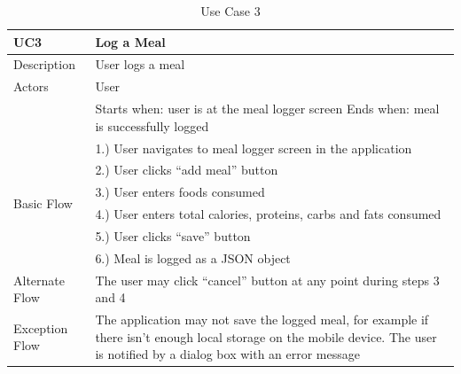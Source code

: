 \documentclass{article}
\begin{document}
\begin{appendicies}
\begin{table}[!htbp]
\centering
\hspace*{-0.5cm}
\begin{tabular}{||m{6cm}|m{6cm}||}
    \hline
    UC3 & Log a Meal\\
    \hline
    Description & User logs a meal\\
    \hline
    Actors & User\\
    \hline
    & Starts when: user is at the meal logger screen \newline
    Ends when: meal is successfully logged\\
    \hline
    \multirow{6}{\hsize}{Basic Flow} 
                                    & 1.) User navigates to meal logger screen in the application\\
                                    & 2.) User clicks “add meal” button\\ 
                                    & 3.) User enters foods consumed\\
                                    & 4.) User enters total calories, proteins, carbs and fats consumed\\
                                    & 5.) User clicks “save” button\\
                                    & 6.) Meal is logged as a JSON object\\
    \hline
    Alternate Flow & The user may click “cancel” button at any point during steps 3 and 4\\
    \hline 
    Exception Flow & The application may not save the logged meal, for example if there isn’t enough local storage on the mobile device. The user is notified by a dialog box with an error message\\
\hline
\end{tabular}
\caption{Use Case 3}
\label{table:UC3}
\end{table}



\end{appendicies}
\end{document}

